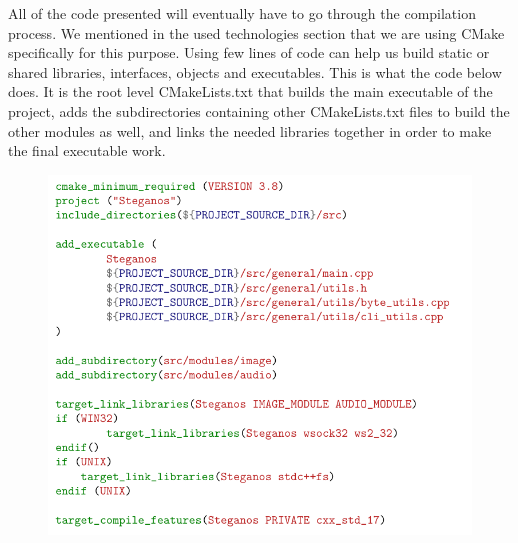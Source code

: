 \vspace{0.7cm}
All of the code presented will eventually have to go through the compilation process. We mentioned in the used technologies section that we are using CMake specifically for this purpose. Using few lines of code can help us build static or shared libraries, interfaces, objects and executables. This is what the code below does. It is the root level CMakeLists.txt that builds the main executable of the project, adds the subdirectories containing other CMakeLists.txt files to build the other modules as well, and links the needed libraries together in order to make the final executable work.
\clearpage
\begin{figure}[H]
    \includegraphics[width=12cm,keepaspectratio]{pics/application_chapter/cmake_code_example}
\end{figure}

